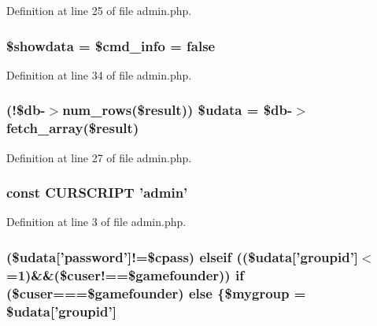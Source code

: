 Definition at line 25 of file admin.\+php.

\hypertarget{admin_8php_afb788491cc92566772efe4972c071c1d}{
\subsubsection[{\$showdata}]{\setlength{\rightskip}{0pt plus 5cm}\$showdata = \$cmd\+\_\+info = {\bf false}}}\label{admin_8php_afb788491cc92566772efe4972c071c1d}


Definition at line 34 of file admin.\+php.

\hypertarget{admin_8php_aa64a6e7c321a5fc5c5089fc201f285cb}{
\subsubsection[{\$udata}]{ (!\$db-\/$>$num\+\_\+rows(\${\bf result})) \$udata = \$db-\/$>$fetch\+\_\+array(\${\bf result})}}\label{admin_8php_aa64a6e7c321a5fc5c5089fc201f285cb}


Definition at line 27 of file admin.\+php.

\hypertarget{admin_8php_a39c39f525eceb86cabc338804f230e80}{
\subsubsection[{C\+U\+R\+S\+C\+R\+I\+P\+T}]{\setlength{\rightskip}{0pt plus 5cm}const C\+U\+R\+S\+C\+R\+I\+P\+T 'admin'}}\label{admin_8php_a39c39f525eceb86cabc338804f230e80}


Definition at line 3 of file admin.\+php.

\hypertarget{admin_8php_af7e27d834f9bcc6589efcd2bf1d9ff80}{
\subsubsection[{else}]{ (\$udata\mbox{[}'password'\mbox{]}!=\$cpass) {\bf elseif} ((\$udata\mbox{[}'groupid'\mbox{]}$<$=1)\&\&(\$cuser!==\$gamefounder)) {\bf if} (\$cuser===\$gamefounder) else \{\$mygroup = \$udata\mbox{[}'groupid'\mbox{]}}}\label{admin_8php_af7e27d834f9bcc6589efcd2bf1d9ff80}


